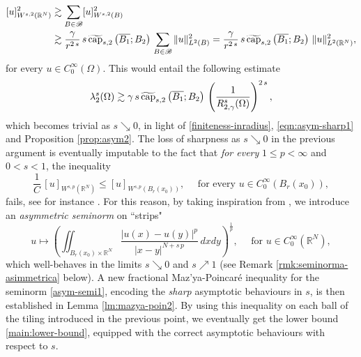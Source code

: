 \documentclass{amsart}
\theoremstyle{definition}
\numberwithin{equation}{section}
\begin{document}
\begin{itemize}
		\[
		\begin{split}
			[u]^2_{W^{s,2}(\mathbb{R}^N)} &\gtrsim \sum_{B \in \mathscr{B}} [u]^2_{W^{s,2}(B)} \\&\gtrsim \frac{\gamma}{r^{2\,s}}\,s\,\widetilde{{\rm cap}}_{s,2}\left(\overline{B_1}; B_2\right)\,\sum_{B \in \mathscr{B}} \|u\|^2_{L^2(B)} = \frac{\gamma}{r^{2\,s}}\,s\,\widetilde{{\rm cap}}_{s,2}\left(\overline{B_1};B_2\right)\,\|u\|^2_{L^2(\mathbb{R}^N)},
		\end{split}
		\]
		for every $u \in C^\infty_0(\Omega)$. This would entail the following estimate
		\[
		\lambda_{2}^s(\Omega) \gtrsim \gamma\,s\,\widetilde{{\rm cap}}_{s,2}\left(\overline{B_1};B_2\right)\,\left(\frac{1}{R^s_{2,\gamma}(\Omega)}\right)^{2\,s},
		\]
		which becomes trivial as $s \searrow 0$, in light of \eqref{finiteness-inradius}, \eqref{eqn:asym-sharp1} and Proposition \ref{prop:asym2}. The loss of sharpness as $s \searrow 0$ in the previous argument is eventually imputable to the fact that {\it for every} $1 \le p < \infty$ and $0 < s < 1$, the inequality 
		\[
		\frac{1}{C}\,[u]_{W^{s,p}(\mathbb{R}^N)} \le [u]_{W^{s,p}(B_r(x_0))}, \quad \mbox{ for every } u \in C^\infty_0(B_r(x_0)),
		\]      
		fails, see for instance \cite[Lemma 2.3]{BS}. For this reason, by taking inspiration from \cite[Proposition 3.1]{BiaBra22}, we introduce an {\it asymmetric seminorm} on ``strips" 
		\begin{equation}\label{asym-semi1}
			u \mapsto \left(\iint_{B_r(x_0) \times \mathbb{R}^N} \frac{|u(x) - u(y)|^{p}}{|x-y|^{N+s\,p}}\,dxdy\right)^{\frac{1}{p}}, \quad \mbox{ for } u \in C^\infty_0(\mathbb{R}^N),
		\end{equation}
		which well-behaves in the limits $s \searrow 0$ and $s \nearrow 1$ (see Remark \ref{rmk:seminorma-asimmetrica} below). A new fractional Maz'ya-Poincar\'e inequality for the seminorm \eqref{asym-semi1}, encoding the {\it sharp} asymptotic behaviours in $s$, is then established in Lemma \ref{lm:mazya-poin2}. By using this inequality on each ball of the tiling introduced in the previous point, we eventually get the lower bound \eqref{main:lower-bound}, equipped with the correct asymptotic behaviours with respect to $s$.   
	\end{itemize}
\end{document}
